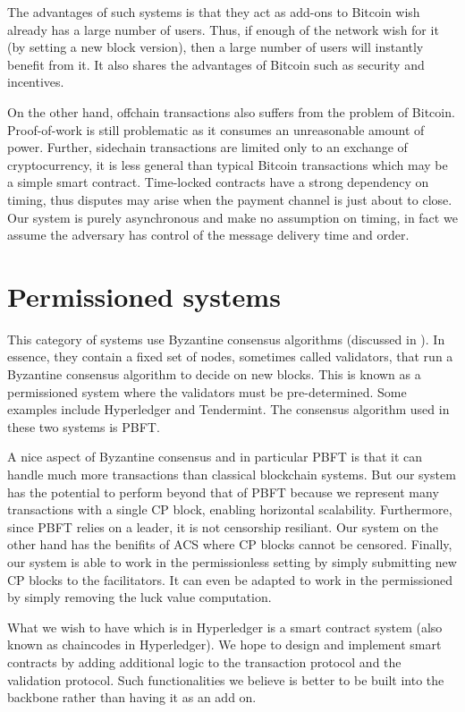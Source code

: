 The advantages of such systems is that they act as add-ons to Bitcoin wish already has a large number of users.
Thus, if enough of the network wish for it (by setting a new block version),
then a large number of users will instantly benefit from it.
It also shares the advantages of Bitcoin such as security and incentives.

On the other hand, offchain transactions also suffers from the problem of Bitcoin.
Proof-of-work is still problematic as it consumes an unreasonable amount of power.
Further, sidechain transactions are limited only to an exchange of cryptocurrency,
it is less general than typical Bitcoin transactions which may be a simple smart contract.
Time-locked contracts have a strong dependency on timing, thus disputes may arise when the payment channel is just about to close.
Our system is purely asynchronous and make no assumption on timing,
in fact we assume the adversary has control of the message delivery time and order.

\section{Permissioned systems}

This category of systems use Byzantine consensus algorithms (discussed in ).
In essence, they contain a fixed set of nodes, sometimes called validators,
that run a Byzantine consensus algorithm to decide on new blocks.
This is known as a permissioned system where the validators must be pre-determined.
Some examples include Hyperledger and Tendermint.
The consensus algorithm used in these two systems is PBFT.

A nice aspect of Byzantine consensus and in particular PBFT is that it can handle much more transactions than classical blockchain systems.
But our system has the potential to perform beyond that of PBFT because we represent many transactions with a single CP block,
enabling horizontal scalability.
Furthermore, since PBFT relies on a leader, it is not censorship resiliant.
Our system on the other hand has the benifits of ACS where CP blocks cannot be censored.
Finally, our system is able to work in the permissionless setting by simply submitting new CP blocks to the facilitators.
It can even be adapted to work in the permissioned by simply removing the luck value computation.

What we wish to have which is in Hyperledger is a smart contract system (also known as chaincodes in Hyperledger).
We hope to design and implement smart contracts by adding additional logic to the transaction protocol and the validation protocol.
Such functionalities we believe is better to be built into the backbone rather than having it as an add on.


